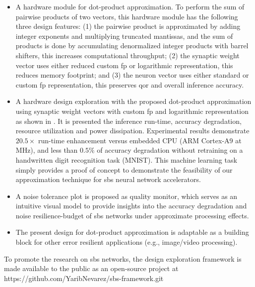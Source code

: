\begin{itemize}
	\item A hardware module for dot-product approximation. To perform the sum of pairwise products of two vectors, this hardware module has the following three design features: (1) the pairwise product is approximated by adding integer exponents and multiplying truncated mantissas, and the sum of products is done by accumulating denormalized integer products with barrel shifters, this increases computational throughput; (2) the synaptic weight vector uses either reduced custom \gls{fp} or logarithmic representation, this reduces memory footprint; and (3) the neuron vector uses either standard or custom \gls{fp} representation, this preserves \gls{qor} and overall inference accuracy.
	\item A hardware design exploration with the proposed dot-product approximation using synaptic weight vectors with custom \gls{fp} and logarithmic representation as shown in . It is presented the inference run-time, accuracy degradation, resource utilization and power dissipation. Experimental results demonstrate $20.5\times$ run-time enhancement versus embedded CPU (ARM Cortex-A9 at \unit[666]{MHz}), and less than $0.5\%$ of accuracy degradation without retraining on a handwritten digit recognition task (MNIST). This machine learning task simply provides a proof of concept to demonstrate the feasibility of our approximation technique for \gls{sbs} neural network accelerators.
	\item A noise tolerance plot is proposed as quality monitor, which serves as an intuitive visual model to provide insights into the accuracy degradation and noise resilience-budget of \gls{sbs} networks under approximate processing effects.
	\item The present design for dot-product approximation is adaptable as a building block for other error resilient applications (e.g., image/video processing).
\end{itemize}

To promote the research on \gls{sbs} networks, the design exploration framework is made available to the public as an open-source project at https://github.com/YaribNevarez/sbs-framework.git

